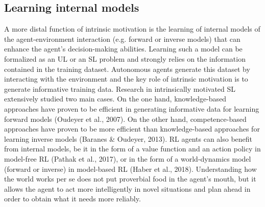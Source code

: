 \subsection{Learning internal models} A more distal function of intrinsic motivation is the learning of internal models of the agent-environment interaction (e.g. forward or inverse models) that can enhance the agent’s decision-making abilities. Learning such a model can be formalized as an UL or an SL problem and strongly relies on the information contained in the training dataset. Autonomous agents generate this dataset by interacting with the environment and the key role of intrinsic motivation is to generate informative training data. Research in intrinsically motivated SL extensively studied two main cases. On the one hand, knowledge-based approaches have proven to be efficient in generating informative data for learning forward models (Oudeyer et al., 2007). On the other hand, competence-based approaches have proven to be more efficient than knowledge-based approaches for learning inverse models (Baranes \& Oudeyer, 2013). RL agents can also benefit from internal models, be it in the form of a value function and an action policy in model-free RL (Pathak et al., 2017), or in the form of a world-dynamics model (forward or inverse) in model-based RL (Haber et al., 2018). Understanding how the world works per se does not put proverbial food in the agent’s mouth, but it allows the agent to act more intelligently in novel situations and plan ahead in order to obtain what it needs more reliably.

